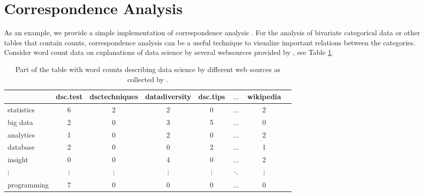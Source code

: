 \documentclass[
]{jdssv}
\begin{document}
\hypertarget{sec:models}{%
\section{Correspondence Analysis}\label{sec:models}}

As an example, we provide a simple implementation of correspondence
analysis \citep[see, e.g.,][]{greenacre2010biplots}. For the analysis of
bivariate categorical data or other tables that contain counts,
correspondence analysis can be a useful technique to visualize important
relations between the categories. Consider word count data on
explanations of data science by several websources provided by
\citet{Lubbe2018}, see Table \ref{tab:word_counts}.

\begin{table}
\caption{Part of the table with word counts describing data science by different web sources as collected by \citet{Lubbe2018}.}
\label{tab:word_counts}
\begin{center}
\begin{tabular}{lccccccc} \hline
            & dsc.test & dsctechniques & datadiversity & dsc.tips & $\ldots$ & wikipedia \\ \hline
statistics  &       6  &           2   &          2    &    0     & $\ldots$ &  2 \\
big data    &       2  &           0   &          3    &    5     & $\ldots$ &  0 \\
analytics   &       1  &           0   &          2    &    0     & $\ldots$ &  2 \\
database    &       2  &           0   &          0    &    2     & $\ldots$ &  1 \\
insight     &       0  &           0   &          4    &    0     & $\ldots$ &  2 \\
$\vdots$    & $\vdots$ &    $\vdots$   &   $\vdots$    & $\vdots$ &$ \ddots$ & $\vdots$ \\
programming &       7  &           0   &          0    &    0     & $\ldots$ &  0 \\
\hline
\end{tabular}
\end{center}
\end{table}
\end{document}
